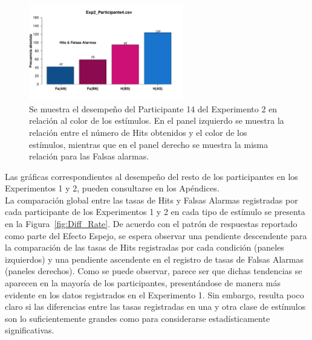 \begin{figure}[th]
\centering
\includegraphics[width=0.60\textwidth]{Figures/MirrorRate_Exp2_P4}
\caption[Diferencias entre Hits y Falsas Alarmas por Condición; Participante ejemplar]{Se muestra el desempeño del Participante 14 del Experimento 2 en relación al color de los estímulos. En el panel izquierdo se muestra la relación entre el número de Hits obtenidos y el color de los estímulos, mientras que en el panel derecho se muestra la misma relación para las Falsas alarmas.}
\label{fig:MirrorRate_E2_P4}
\end{figure}

Las gráficas correspondientes al desempeño del resto de los participantes en los Experimentos 1 y 2, pueden consultarse en los Apéndices.\\

La comparación global entre las tasas de Hits y Falsas Alarmas registradas por cada participante de los Experimentos 1 y 2 en cada tipo de estímulo se presenta en la Figura~\ref{fig:Diff_Rate}. De acuerdo con el patrón de respuestas reportado como parte del Efecto Espejo, se espera observar una pendiente descendente para la comparación de las tasas de Hits registradas por cada condición (paneles izquierdos) y una pendiente ascendente en el registro de tasas de Falsas Alarmas (paneles derechos). Como se puede observar, parece ser que dichas tendencias se aparecen en la mayoría de los participantes, presentándose de manera más evidente en los datos registrados en el Experimento 1. Sin embargo, resulta poco claro si las diferencias entre las tasas registradas en una y otra clase de estímulos son lo suficientemente grandes como para considerarse estadísticamente significativas.\\

